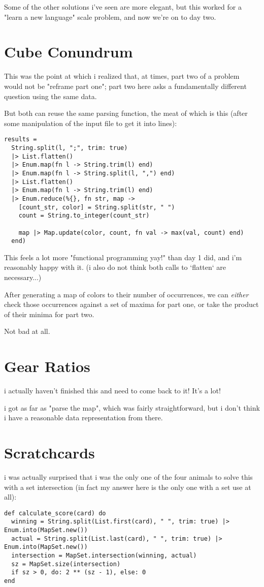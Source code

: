 \documentclass{article}
\begin{document}
Some of the other solutions i've seen are more elegant, but this worked for a "learn a new language" scale problem, and now we're on to day two.

\section{Cube Conundrum}

This was the point at which i realized that, at times, part two of a problem would not be "reframe part one"; part two here asks a fundamentally different question using the same data.

But both can reuse the same parsing function, the meat of which is this (after some manipulation of the input file to get it into lines):
\begin{verbatim}
results =
  String.split(l, ";", trim: true)
  |> List.flatten()
  |> Enum.map(fn l -> String.trim(l) end)
  |> Enum.map(fn l -> String.split(l, ",") end)
  |> List.flatten()
  |> Enum.map(fn l -> String.trim(l) end)
  |> Enum.reduce(%{}, fn str, map ->
    [count_str, color] = String.split(str, " ")
    count = String.to_integer(count_str)

    map |> Map.update(color, count, fn val -> max(val, count) end)
  end)
\end{verbatim}

This feels a lot more "functional programming yay!" than day 1 did, and i'm reasonably happy with it. (i also do not think both calls to `flatten` are necessary...)

After generating a map of colors to their number of occurrences, we can \textit{either} check those occurrences against a set of maxima for part one, or take the product of their minima for part two.

Not bad at all.

\section{Gear Ratios}

i actually haven't finished this and need to come back to it! It's a lot!

i got as far as "parse the map", which was fairly straightforward, but i don't think i have a reasonable data representation from there.

\section{Scratchcards}
i was actually surprised that i was the only one of the four animals to solve this with a set intersection (in fact my answer here is the only one with a set use at all):
\begin{verbatim}
def calculate_score(card) do
  winning = String.split(List.first(card), " ", trim: true) |> Enum.into(MapSet.new())
  actual = String.split(List.last(card), " ", trim: true) |> Enum.into(MapSet.new())
  intersection = MapSet.intersection(winning, actual)
  sz = MapSet.size(intersection)
  if sz > 0, do: 2 ** (sz - 1), else: 0
end
\end{verbatim}
\end{document}
